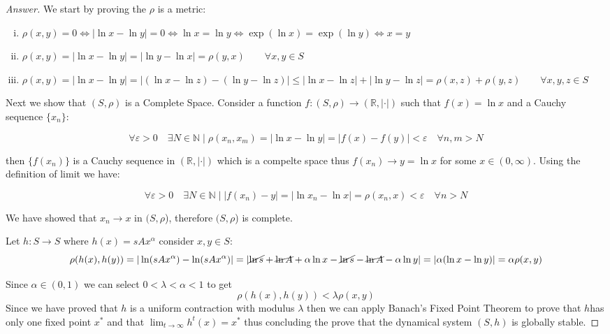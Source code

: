 \documentclass{article}
\begin{document}
\begin{proof}[Answer]
    We start by proving the $\rho$ is a metric:
    \begin{enumerate}[(i)]
        \item $\rho(x,y) = 0 \iff |\ln x - \ln y|=0 \iff \ln x = \ln y \iff \exp(\ln x) = \exp(\ln y)\iff x = y$
        \item $\rho(x,y) =  |\ln x - \ln y| =  |\ln y - \ln x| = \rho(y,x) \qquad \forall x,y\in S$
        \item $\rho(x,y) =  |\ln x - \ln y| = |(\ln x - \ln z) - (\ln y -\ln z)| \leq |\ln x - \ln z| + |\ln y -\ln z| = \rho(x,z) + \rho(y,z)\qquad \forall x,y,z\in S$
    \end{enumerate}

    Next we show that $(S,\rho)$ is a Complete Space. Consider a function $f:(S,\rho)\to (\mathbb{R}, |\cdot|)$ such that $f(x) = \ln x$  and a Cauchy sequence $\{x_n\}$:
    
    $$\forall \varepsilon> 0 \quad \exists N \in \mathbb{N} \mid \rho(x_n,x_m) = |\ln x - \ln y| = |f(x) - f(y)| < \varepsilon \quad \forall n,m > N $$

    then $\{f(x_n)\}$ is a Cauchy sequence in $(\mathbb{R},|\cdot|)$ which is a compelte space thus $f(x_n) \to y = \ln x $ for some $x\in (0, \infty)$. Using the definition of limit we have:
    
    $$\forall \varepsilon > 0 \quad \exists N\in \mathbb{N}\mid |f(x_n) - y| = |\ln x_n - \ln x| = \rho(x_n,x) < \varepsilon     \quad \forall n> N$$

    We have showed that $x_n \to x$ in $(S, \rho$), therefore $(S, \rho$) is complete.

    Let $h: S \to S$ where $h(x) = sAx^\alpha$ consider $x,y\in S$:
    $$\rho(h(x),h(y)) = |\ln (sAx^\alpha) - \ln (sAx^\alpha)| = |\cancel{\ln s} + \cancel{\ln A} + \alpha \ln x - \cancel{\ln s}  - \cancel{\ln A} - \alpha \ln y| = |\alpha(\ln x - \ln y)| = \alpha \rho(x,y)$$

    Since $\alpha \in (0,1)$ we can select $0<\lambda < \alpha < 1$ to get $$\rho(h(x), h(y))< \lambda \rho(x,y)$$ Since we have proved that $h$ is a uniform contraction with modulus $\lambda$ then we can apply Banach's Fixed Point Theorem to prove that $h$has only one fixed point $x^*$ and that $\lim_{t\to \infty} h^t(x) = x^*$ thus concluding the prove that the dynamical system $(S, h)$ is globally stable.


\end{proof}
\end{document}
